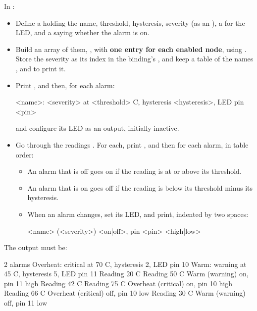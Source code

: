 \label{c2:ex:3.3}

In :

\begin{itemize}
  \item Define a  holding the name, threshold, hysteresis, severity (as an ), a
     for the LED, and a  saying whether the alarm is on.
  \item Build an array of them, , with \textbf{one entry for each enabled 
    node}, using . Store the severity as its index in the binding’s
    , and keep a table of the names ,  and  to
    print it.
  \item Print , and then, for each alarm:
\begin{console}
<name>: <severity> at <threshold> C, hysteresis <hysteresis>, LED pin <pin>
\end{console}
and configure its LED as an output, initially inactive.
  \item Go through the readings . For each,
    print , and then for each alarm, in table order:
\begin{itemize}
  \item An alarm that is off goes on if the reading is at or above its threshold.
  \item An alarm that is on goes off if the reading is below its threshold minus its hysteresis.
  \item When an alarm changes, set its LED, and print, indented by two spaces:
\begin{console}
  <name> (<severity>) <on|off>, pin <pin> <high|low>
\end{console}
\end{itemize}
\end{itemize}

The output must be:

\begin{console}
2 alarms
Overheat: critical at 70 C, hysteresis 2, LED pin 10
Warm: warning at 45 C, hysteresis 5, LED pin 11
Reading 20 C
Reading 50 C
  Warm (warning) on, pin 11 high
Reading 42 C
Reading 75 C
  Overheat (critical) on, pin 10 high
Reading 66 C
  Overheat (critical) off, pin 10 low
Reading 30 C
  Warm (warning) off, pin 11 low
\end{console}


